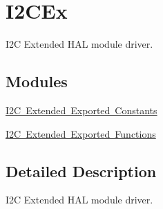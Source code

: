 \hypertarget{group___i2_c_ex}{}\section{I2\+C\+Ex}
\label{group___i2_c_ex}


I2C Extended H\+AL module driver.  


\subsection*{Modules}
\begin{DoxyCompactItemize}
\item 
\mbox{\hyperlink{group___i2_c_ex___exported___constants}{I2\+C Extended Exported Constants}}
\item 
\mbox{\hyperlink{group___i2_c_ex___exported___functions}{I2\+C Extended Exported Functions}}
\end{DoxyCompactItemize}


\subsection{Detailed Description}
I2C Extended H\+AL module driver. 

